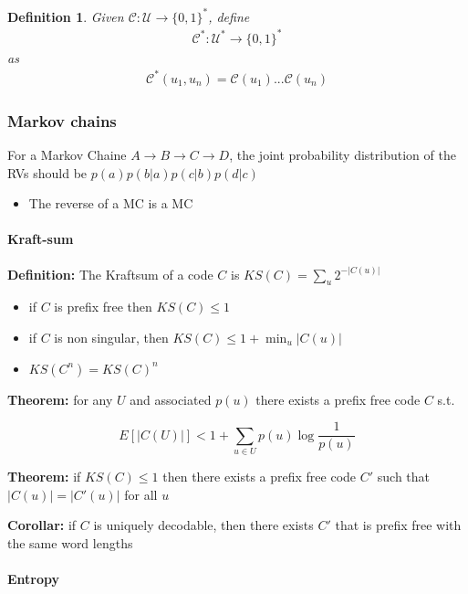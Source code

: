 \documentclass{article}
\newtheorem{definition}{Definition}[section]
\def\U{\mathcal{U}}
\def\C{\mathcal{C}}
\begin{document}
\begin{definition}
	Given $\C : \U \rightarrow \{ 0, 1\}^*$, define
	\begin{align*}
		\C^* : \U^* \rightarrow \{0, 1\}^*
	\end{align*}
	as
	\begin{align*}
		\C^*(u_1, u_n) = \C(u_1)...\C(u_n)
	\end{align*}
\end{definition}


\subsubsection{Markov chains}\label{markov-chains}

For a Markov Chaine $A \to B \to C \to D$, the joint probability
distribution of the RVs should be $p(a)p(b|a)p(c|b)p(d|c)$

\begin{itemize}
\item
  The reverse of a MC is a MC
\end{itemize}

\paragraph{Kraft-sum}\label{kraft-sum}

\textbf{Definition:} The Kraftsum of a code $C$ is
$KS(C) = \sum_u 2^{-|C(u)|}$

\begin{itemize}
\item
  if $C$ is prefix free then $KS(C) \leq 1$
\item
  if $C​$ is non singular, then $KS(C) \leq 1 + \min_u |C(u)|​$
\item
  $KS(C^n) = KS(C)^n$
\end{itemize}

\textbf{Theorem:} for any $U$ and associated $p(u)$ there exists a
prefix free code $C$ s.t.

\[E[|C(U)|] < 1 + \sum_{u\in U} p(u) \log \frac 1 {p(u)}\]

\textbf{Theorem:} if $KS(C)\leq 1$ then there exists a prefix free
code $C'$ such that $|C(u)| = |C'(u)|$ for all $u$

\textbf{Corollar:} if $C$ is uniquely decodable, then there exists
$C'$ that is prefix free with the same word lengths

\paragraph{Entropy}\label{entropy}
\end{document}
